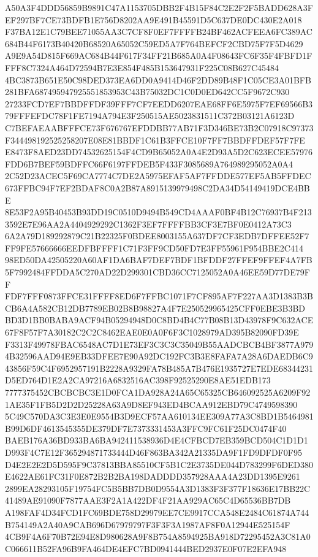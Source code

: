 \documentclass[UTF8,fontset=fandol,zihao=-4,a4paper]{ctexart}
\begin{document}
{{A50A3F4DDD56859B9891C47A1153705DBB2F4B15F84C2E2F2F5BADD628A3FEF297BF7CE73BDFB1E756D8202AA9E491B45591D5C637DE0DC430E2A018
F37BA12E1C79BEE71055AA3C7CF8F0EF7FFFFB24BF462ACFEEA6FC389AC684B44F6173B40420B68520A65052C59ED5A7F764BEFCF2CBD75F7F5D4629
A9E9A54D815F669AC684B44F617F34FF21B685A0A4F08643FC6F35F4FBFD1FFFF8C7324A464D72594B7E3E854F485B153647931F225C08B627C45484
4BC3873B651E50C98DED373EA6DD0A9414D46F2DD89B48F1C05CE3A01BFB281BFA687495947925551853953C43B75032DC1C0D0ED642CC5F9672C930
27233FCD7EF7BBDFFDF39FFF7CF7EEDD6207EAE68FF6E5975F7EF69566B379FFFEFDC78F1FE7194A794E3F250515AE5023831511C372B03121A6123D
C7BEFAEAABFFFCE73F676767EFDDBB77AB71F3D346BE73B2C07918C97373F344498192525258207E08E81BBDF1C61B3FFCE10F7FF7BBDFFDEF57F7FE
E8473F8AED23DD74532625154F4CD9B65052A0A4E2D93A5D2C623ECEE57976FDD6B7BEF59BDFFC66F6197FFDEB5F433F3085689A764989295052A0A4
2C52D23ACEC5F69CA7774C7DE2A5975EFAF5AF7FFDDE577EF5AB5FFDEC673FFBC94F7EF2BDAF8C0A2B87A8915139979498C2DA34D54149419DCE4BBE
8E53F2A95B40453B93DD19C0510D9494B549CD4AAAF0BF4B12C76937B4F2133592E7E96AA2A4404929292C1362F3EF7FFFFBB3CF3E7BF0E0412A73C3
6A2A79D189292879C21B22325F0BDEE8003155A637DF7CF3EDB7DFFEE52F7FF9FE57666666EEDFBFFFF1C71F3FF9CD50FD7E3FF55961F954BBE2C414
98ED50DA42505220A60AF1DA6BAF7DEF7BDF1BFDDF27FFEF9FFEF4A7FB5F7992484FFDDA5C270AD22D299301CBD36CC7125052A0A46EE59D77DE79FF
FDF7FFF0873FFCE31FFFF8ED6F7FFBC1071F7CF895AF7F227AA3D1383B3BCB6A4A582CB12DB7789EB02B8B98827A4F7E250529965425CFF0EBE3B3BD
BD3D1BB0BABA9ACF94B05294948D0C8BD4B4C77B08B13D43978F9C632ACE67F8F57F7A30182C2C2C8462EAE0E0A0F6F3C1028979AD395B82090FD39E
F3313F49978FBAC6548AC7D1E73EF3C3C3C35049B55AADCBCB4BF3877A9794B32596AAD94E9EB33DFEE7E90A92DC192FC3B3E8FAFA7A28A6DAEDB6C9
43856F59C4F6952957191B2228A9329FA78B485A7B476E1935727E7EDE68344231D5ED764D1E2A2CA97216A6832516AC398F92525290E8AE51EDB173
7777375452CBCBCBC3E1D0FCA1DA928A24A65C65325CB646092525A6209F921AE35F1FB5D2D2D25228A63A9D8EF943ED4BCAA912EBD79C4749598390
5C49C570DA3C3E3E0E9554B3D9ECF57AA610134EE309A77A3C8BD1B5464981B99D6DF4613545355DE379DF7E7373331453A3FFC9FC61F25DC0474F40
BAEB176A36BD933BA6BA942411538936D4E4CFBCD7EB359BCD504C1D1D1D993F4C7E12F365294871733444D46F863BA342A21335DA9F1FD9DFDF0F95
D4E2E2E2D5D595F9C37813BBA85510CF5B1C2E3735DE044D783299F6DED380E4622AE61FC31F0E872B2B2BA198DADDDD357928AAA4A23DD1395E9261
2899EA28293105F19754FC5B5BB7DB0D9554A3D1383F3F377F18636E17BB22C41489AE91090F7877AAE3F2A1A422DF4F21AA929AC65C4D65536BB7DB
A198FAF4D34FCD1FC69BDE758D29979EE7CE9917CCA548E2484C61874A744B754149A2A40A9CAB696D67979797F3F3F3A1987AF8F0A12944E525154F
4CB9F4A6F70B72E94E8D980628A9F8B754A8594925BA918D72295452A3C81A0C066611B52FA96B9FA464DE4EFC7BD0941444BED2937E0F07E2EFA948
}}
\end{document}
